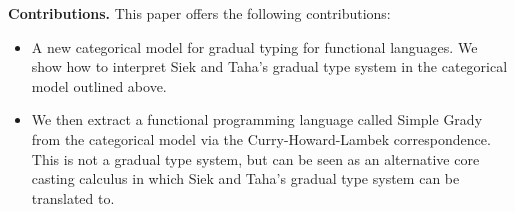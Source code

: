 \textbf{Contributions.} This paper offers the following contributions:
\begin{itemize}

\item A new categorical model for gradual typing for functional
  languages.  We show how to interpret Siek and Taha's
  \cite{Siek:2015} gradual type system in the categorical model
  outlined above.

\item We then extract a functional programming language called Simple
  Grady from the categorical model via the Curry-Howard-Lambek
  correspondence.  This is not a gradual type system, but can be seen
  as an alternative core casting calculus in which Siek and Taha's
  gradual type system can be translated to.
  
\end{itemize}

